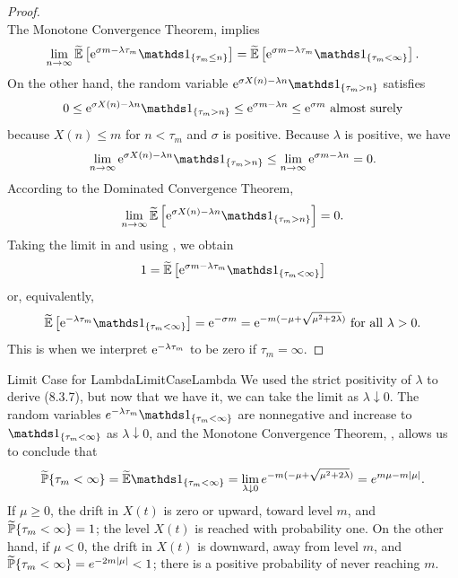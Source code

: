 \begin{proof}
\[	\]
	The Monotone Convergence Theorem,  implies
	\begin{equation} \label{eq:MonotoneConvergenceLimit}
		\lim_{n \to \infty} \widetilde{\E}\left[\e^{\sigma m - \lambda \tau_m}\I_{\{\tau_m \le n\}}\right] = \widetilde{\E}\left[\e^{\sigma m - \lambda \tau_m}\I_{\{\tau_m < \infty\}}\right].
	\end{equation}
	On the other hand, the random variable $\e^{\sigma X(n) - \lambda n}\I_{\{\tau_m > n\}}$ satisfies
	\[
		0 \le \e^{\sigma X(n) - \lambda n}\I_{\{\tau_m > n\}} \le \e^{\sigma m - \lambda n} \le \e^{\sigma m} \text{ almost surely}
	\]
	because $X(n) \le m$ for $n < \tau_m$ and $\sigma$ is positive. Because $\lambda$ is positive, we have
	\[
		\lim_{n \to \infty} \e^{\sigma X(n) - \lambda n}\I_{\{\tau_m > n\}} \le \lim_{n \to \infty} \e^{\sigma m - \lambda n} = 0.
	\]
	According to the Dominated Convergence Theorem, 
	\begin{equation} \label{eq:DominatedConvergenceLimit}
		\lim_{n \to \infty} \widetilde{\E}\left[\e^{\sigma X(n) - \lambda n}\I_{\{\tau_m > n\}}\right] = 0.
	\end{equation}
	Taking the limit in  and using , we obtain
	\[
		1 = \widetilde{\E}\left[\e^{\sigma m - \lambda \tau_m}\I_{\{\tau_m < \infty\}}\right]
	\]
	or, equivalently,
	\begin{equation} \label{eq:FinalLaplaceResult}
		\widetilde{\E}\left[\e^{-\lambda \tau_m}\I_{\{\tau_m < \infty\}}\right] = \e^{-\sigma m} = \e^{-m(-\mu + \sqrt{\mu^2 + 2\lambda})} \text{ for all } \lambda > 0.
	\end{equation}
	This is  when we interpret $\mathrm{e}^{-\lambda \tau_m}$ to be zero if $\tau_m = \infty$.
\end{proof}

\begin{xtip}{Limit Case for Lambda}{LimitCaseLambda}
	We used the strict positivity of $\lambda$ to derive (8.3.7), but now that we have it, we can take the limit as $\lambda \downarrow 0$. The random variables $e^{-\lambda \tau_m} \I_{\set{\tau_m < \infty}}$ are nonnegative and increase to $\I_{\set{\tau_m < \infty}}$ as $\lambda \downarrow 0$, and the Monotone Convergence Theorem, , allows us to conclude that
	\begin{equation*}
		\widetilde{\Prob}\set{\tau_m < \infty} = \widetilde{\E}\I_{\set{\tau_m < \infty}} = \lim_{\lambda \downarrow 0} e^{-m(-\mu + \sqrt{\mu^2 + 2\lambda})} = e^{m\mu - m\abs{\mu}}.
	\end{equation*}
	If $\mu \ge 0$, the drift in $X(t)$ is zero or upward, toward level $m$, and $\widetilde{\mathbb{P}}\{\tau_m < \infty\} = 1$; the level $X(t)$ is reached with probability one. On the other hand, if $\mu < 0$, the drift in $X(t)$ is downward, away from level $m$, and $\widetilde{\mathbb{P}}\{\tau_m < \infty\} = e^{-2m\lvert\mu\rvert} < 1$; there is a positive probability of never reaching $m$.
\end{xtip}

